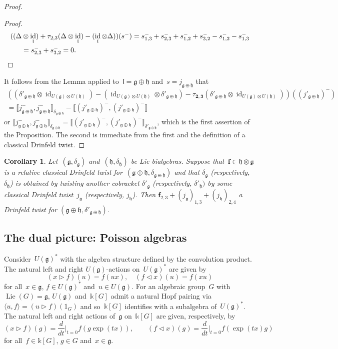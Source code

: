 \documentclass[12pt, reqno]{amsart}
\newcommand{\cybe}[1]{\mathbb{\Lbrack}#1,#1\mathbb{\Rbrack}}
\newtheorem{corollary}[theorem]{Corollary}
\theoremstyle{definition}
\numberwithin{equation}{section}
\newcommand{\tensor}{\otimes}
\newcommand{\kk}{\mathbb{k}}\newcommand{\lie}[1]{{\mathfrak{#1}}}
\DeclareMathOperator{\id}{id}
\begin{document}
\begin{proof}
\begin{proof}
\begin{align*}
((\Delta&\tensor\id_{\lie l})+\tau_{2,3}(\Delta\tensor\id_{\lie l})
-(\id_{\lie l}\tensor\Delta))(s^-)
=s^-_{1,3}+s^-_{2,3}+s^-_{1,2}+s^-_{3,2}-
s^-_{1,2}-s^-_{1,3}\\
&=s^-_{2,3}+s^-_{3,2}=0.\qedhere 
\end{align*}
\end{proof}
It follows from the Lemma applied to~$\lie l=\lie g\oplus\lie h$ and~$s=
 j _{\lie g\oplus\lie h}$ that 
\begin{multline*}
((\delta'_{\lie g\oplus\lie h}\tensor\id_{U(\lie g)\tensor U(\lie h)})-
(\id_{U(\lie g)\tensor U(\lie h)}\tensor\delta'_{\lie g\oplus\lie h})
-\tau_{\mathbf 2,\mathbf 3}(\delta'_{\lie g\oplus\lie h}\tensor\id_{U(\lie g)\tensor U(\lie h)}))(( j '_{\lie g\oplus\lie h})^-)\\
=\cybe{ j ^-_{\lie g\oplus\lie h}}_{\delta_{\lie g\oplus \lie h}}-
\cybe{( j '_{\lie g\oplus\lie h})^-}
\end{multline*}
or
$
\cybe{ j ^-_{\lie g\oplus\lie h}}_{\delta_{\lie g\oplus \lie h}}=
\cybe{( j '_{\lie g\oplus\lie h})^-}_{\delta'_{\lie g\oplus \lie h}}$, 
which is the first assertion of the Proposition. The second is immediate
from the first and the definition of a classical Drinfeld twist.
\end{proof}
\begin{corollary}\label{cor:clas twist from rel twist}
Let~$(\lie g,\delta_{\lie g})$ and~$(\lie h,\delta_{\lie h})$ be Lie bialgebras.
Suppose 
that~$\mathbf f\in\lie h\tensor \lie g$ is a relative classical Drinfeld twist for~$(\lie g\oplus\lie h,\delta_{\lie g\oplus \lie h})$ and that $\delta_{\lie g}$ (respectively, $\delta_{\lie h}$)
is obtained by twisting another cobracket $\delta'_{\lie g}$ (respectively, $\delta'_{\lie h})$ by some classical Drinfeld twist~$ j _{\lie g}$ (respectively, $ j _{\lie h}$). Then $\mathbf f_{2,3}+( j _{\lie g})_{1,3}+( j _{\lie h})_{2,4}$ 
 a Drinfeld twist for $(\lie g\oplus \lie h,\delta'_{\lie g\oplus\lie h})$.
\end{corollary}

\subsection{The dual picture: Poisson algebras}\label{subs:Poisson alg}
Consider~$U(\lie g)^*$ with the algebra structure defined by the convolution product.
The natural left and right $U(\lie g)$-actions on~$ U(\lie g)^*$ are given by
$$
(x\triangleright f)(u)=f(u x),\quad 
(f\triangleleft x)(u)=f(x u)
$$
for all~$x\in \lie g$, $f\in   U(\lie g)^* $ and~$u\in U(\lie g)$.
For an algebraic group~$G$ with~$\operatorname{Lie}(G)=\lie g$,
$U(\lie g)$ and~$\kk[G]$ admit a natural Hopf pairing via 
$\langle u,f\rangle=(u\triangleright f)(1_G)$ and so~$\kk[G]$ identifies
with a subalgebra of~$U(\lie g)^*$. The natural left 
and right actions of~$\lie g$ on~$\kk[G]$ are given, respectively, by
\begin{equation}\label{eq:g act k[G]}
(x\triangleright f)(g)=\frac{d}{dt}\Big|_{t=0}f(g\exp(tx)),
\qquad (f\triangleleft x)(g)=\frac{d}{dt}\Big|_{t=0}
f(\exp(tx)g)
\end{equation}
for all~$f\in\kk[G]$, $g\in G$ and~$x\in \lie g$.
\end{document}
